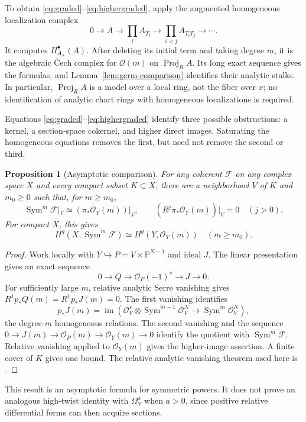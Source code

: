 \documentclass[11pt,reqno]{amsart}
\numberwithin{equation}{section}
\newtheorem{proposition}[theorem]{Proposition}
\theoremstyle{definition}
\theoremstyle{remark}
\newcommand{\OO}{\mathcal O}
\newcommand{\FF}{\mathcal F}
\newcommand{\PP}{\mathbb P}
\newcommand{\Sym}{\operatorname{Sym}}
\DeclareMathOperator{\Proj}{Proj}
\begin{document}
To obtain \eqref{eq:graded}--\eqref{eq:highergraded}, apply the augmented homogeneous localization complex
\[
 0\longrightarrow A\longrightarrow\prod_i A_{T_i}
 \longrightarrow\prod_{i<j}A_{T_iT_j}\longrightarrow\cdots.
\]
It computes $H^\bullet_{A_+}(A)$. After deleting its initial term and taking degree $m$, it is the algebraic \v Cech complex for $\OO(m)$ on $\Proj_R A$. Its long exact sequence gives the formulas, and Lemma~\ref{lem:germ-comparison} identifies their analytic stalks. In particular, $\Proj_R A$ is a model over a local ring, not the fiber over $x$; no identification of analytic chart rings with homogeneous localizations is required.

Equations \eqref{eq:graded}--\eqref{eq:highergraded} identify three possible obstructions: a kernel, a section-space cokernel, and higher direct images. Saturating the homogeneous equations removes the first, but need not remove the second or third.

\begin{proposition}[Asymptotic comparison]\label{prop:asymptotic}
For any coherent $\FF$ on any complex space $X$ and every compact subset $K\subset X$, there are a neighborhood $V$ of $K$ and $m_0\geq0$ such that, for $m\geq m_0$,
\[
 \Sym^m\FF|_V\simeq(\pi_*\OO_Y(m))|_V,
 \qquad (R^j\pi_*\OO_Y(m))|_V=0\quad(j>0).
\]
For compact $X$, this gives
\[
 H^q(X,\Sym^m\FF)\simeq H^q(Y,\OO_Y(m))\quad(m\geq m_0).
\]
\end{proposition}
\begin{proof}
Work locally with $Y\hookrightarrow P=V\times\PP^{N-1}$ and ideal $J$. The linear presentation gives an exact sequence
\[
 0\to Q\to\OO_P(-1)^s\to J\to0.
\]
For sufficiently large $m$, relative analytic Serre vanishing gives $R^1p_*Q(m)=R^1p_*J(m)=0$. The first vanishing identifies
\[
 p_*J(m)=\operatorname{im}\!\left(
 \OO_V^s\otimes\Sym^{m-1}\OO_V^N
       \longrightarrow\Sym^m\OO_V^N\right),
\]
the degree-$m$ homogeneous relations. The second vanishing and the sequence $0\to J(m)\to\OO_P(m)\to\OO_Y(m)\to0$ identify the quotient with $\Sym^m\FF$. Relative vanishing applied to $\OO_Y(m)$ gives the higher-image assertion. A finite cover of $K$ gives one bound. The relative analytic vanishing theorem used here is \cite[IV, Theorem 2.1]{Banica}.
\end{proof}

This result is an asymptotic formula for symmetric powers. It does not prove an analogous high-twist identity with $\Omega_Y^a$ when $a>0$, since positive relative differential forms can then acquire sections.
\end{document}
